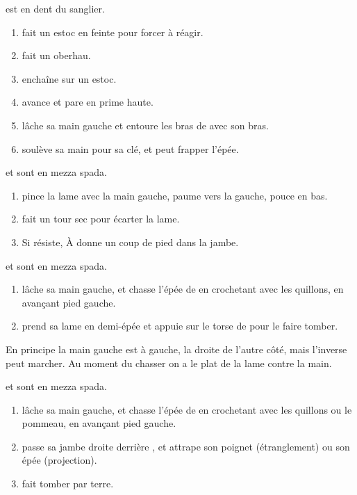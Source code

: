 \begin{technique}

\A est en dent du sanglier.

\begin{enumerate}
	\item \A fait un estoc en feinte pour forcer \D à réagir.
	\item \D fait un oberhau.
	\item \D enchaîne sur un estoc.
	\item \A avance et pare en prime haute.
	\item \A lâche sa main gauche et entoure les bras de \D avec son bras.
	\item \A soulève sa main pour sa clé, et peut frapper l'épée.
\end{enumerate}
\end{technique}


\begin{technique}

\A et \D sont en mezza spada.

\begin{enumerate}
	\item \A pince la lame avec la main gauche, paume vers la gauche, pouce en bas.
	\item \A fait un tour sec pour écarter la lame.
	\item Si \D résiste, À donne un coup de pied dans la jambe.
\end{enumerate}
\end{technique}


\begin{technique}

\A et \D sont en mezza spada.

\begin{enumerate}
	\item \A lâche sa main gauche, et chasse l'épée de \D en crochetant avec les quillons, en avançant pied gauche.
	\item \A prend sa lame en demi-épée et appuie sur le torse de \D pour le faire tomber.
\end{enumerate}

En principe la main gauche est à gauche, la droite de l'autre côté, mais l'inverse peut marcher.
Au moment du chasser on a le plat de la lame contre la main.
\end{technique}


\begin{technique}

\A et \D sont en mezza spada.

\begin{enumerate}
	\item \A lâche sa main gauche, et chasse l'épée de \D en crochetant avec les quillons ou le pommeau, en avançant pied gauche.
	\item \A passe sa jambe droite derrière \D, et attrape son poignet (étranglement) ou son épée (projection).
	\item \A fait tomber \D par terre.
\end{enumerate}
\end{technique}


